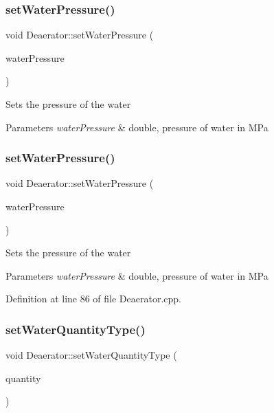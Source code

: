 \subsubsection{\texorpdfstring{set\+Water\+Pressure()}{setWaterPressure()}\hspace{0.1cm}{\footnotesize\ttfamily [2/3]}}
{\footnotesize\ttfamily void Deaerator\+::set\+Water\+Pressure (\begin{DoxyParamCaption}\item[{double}]{water\+Pressure }\end{DoxyParamCaption})}

Sets the pressure of the water 
\begin{DoxyParams}{Parameters}
{\em water\+Pressure} & double, pressure of water in M\+Pa \\
\hline
\end{DoxyParams}
\mbox{\label{class_deaerator_ae23f64c6983daed388a73c033a15e176}} 
\subsubsection{\texorpdfstring{set\+Water\+Pressure()}{setWaterPressure()}\hspace{0.1cm}{\footnotesize\ttfamily [3/3]}}
{\footnotesize\ttfamily void Deaerator\+::set\+Water\+Pressure (\begin{DoxyParamCaption}\item[{double}]{water\+Pressure }\end{DoxyParamCaption})}

Sets the pressure of the water 
\begin{DoxyParams}{Parameters}
{\em water\+Pressure} & double, pressure of water in M\+Pa \\
\hline
\end{DoxyParams}


Definition at line 86 of file Deaerator.\+cpp.

\mbox{\label{class_deaerator_ac60ad3d6650ed6c7783d18833bb7e3dd}} 
\subsubsection{\texorpdfstring{set\+Water\+Quantity\+Type()}{setWaterQuantityType()}\hspace{0.1cm}{\footnotesize\ttfamily [1/3]}}
{\footnotesize\ttfamily void Deaerator\+::set\+Water\+Quantity\+Type (\begin{DoxyParamCaption}\item[{\hyperlink{class_steam_properties_ae0294bedf7d178c2d8fb6aed0f62fbff}{Steam\+Properties\+::\+Thermodynamic\+Quantity}}]{quantity }\end{DoxyParamCaption})}

